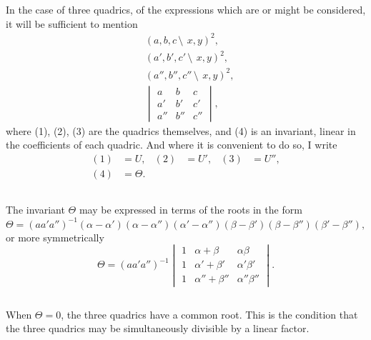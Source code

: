 \documentclass[12pt,a4paper]{article}
\begin{document}
In the case of three quadrics, of the expressions which are or might be considered, it will be sufficient to mention
\begin{align}
&(a, b, c\,\setminus\!\!\:\, x, y)^2, \tag{1}\\
&(a', b', c'\,\setminus\!\!\:\, x, y)^2, \tag{2}\\
&(a'', b'', c''\,\setminus\!\!\:\, x, y)^2, \tag{3}\\
&\begin{vmatrix}
a & b & c \\
a' & b' & c' \\
a'' & b'' & c''
\end{vmatrix}, \tag{4}
\end{align}
where (1), (2), (3) are the quadrics themselves, and (4) is an invariant, linear in the coefficients of each quadric. And where it is convenient to do so, I write
\begin{align*}
(1) &= U, & (2) &= U', & (3) &= U'',\\
(4) &= \Theta.
\end{align*}

\subsection{}

The invariant $\Theta$ may be expressed in terms of the roots in the form
\[
\Theta = (aa'a'')^{-1}(\alpha - \alpha')(\alpha - \alpha'')(\alpha' - \alpha'')(\beta - \beta')(\beta - \beta'')(\beta' - \beta''),
\]
or more symmetrically
\[
\Theta = (aa'a'')^{-1}
\begin{vmatrix}
1 & \alpha + \beta & \alpha\beta \\
1 & \alpha' + \beta' & \alpha'\beta' \\
1 & \alpha'' + \beta'' & \alpha''\beta''
\end{vmatrix}.
\]

\subsection{}

When $\Theta = 0$, the three quadrics have a common root. This is the condition that the three quadrics may be simultaneously divisible by a linear factor.

\subsection{}
\end{document}
